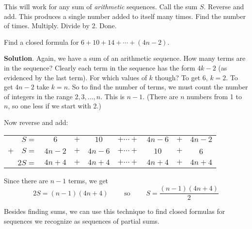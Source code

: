 \documentclass[11pt,]{book}
\theoremstyle{ptxplainnotitle}
\theoremstyle{ptxplaintitle}
\theoremstyle{ptxdefinitionnotitle}
\theoremstyle{ptxdefinitiontitle}
\theoremstyle{ptxdefinitionnotitle}
\theoremstyle{ptxdefinitiontitle}
\theoremstyle{ptxdefinitionnotitle}
\theoremstyle{ptxdefinitiontitle}
\theoremstyle{ptxdefinitiontitlenonumber}
\theoremstyle{ptxdefinitiontitlenonumber}
\numberwithin{equation}{chapter}
\newcommand{\hrulethin}  {\noalign{\hrule height 0.04em}}
\begin{document}
\hypertarget{p-197}{}%
This will work for any sum of \emph{arithmetic} sequences. Call the sum \(S\). Reverse and add. This produces a single number added to itself many times. Find the number of times. Multiply. Divide by 2. Done.%
\begin{example}\label{example-8}
\hypertarget{p-198}{}%
Find a closed formula for \(6 + 10 + 14 + \cdots + (4n - 2)\).%
\par\smallskip%
\noindent\textbf{Solution}.\hypertarget{solution-16}{}\quad%
\hypertarget{p-199}{}%
Again, we have a sum of an arithmetic sequence. How many terms are in the sequence?  Clearly each term in the sequence has the form \(4k -2\) (as evidenced by the last term). For which values of \(k\) though? To get 6, \(k = 2\). To get \(4n-2\) take \(k = n\). So to find the number of terms, we must count the number of integers in the range \(2,3,\ldots, n\). This is \(n-1\). (There are \(n\) numbers from 1 to \(n\), so one less if we start with 2.)%
\par
\hypertarget{p-200}{}%
Now reverse and add:%
\begin{sidebyside}{1}{0}{0}{0}
\begin{sbspanel}{1}
{\centering%
\begin{tabular}{rccccccc}
\(S  =\)&\(6\)&\(+\)&\(10\)&\(+ \cdots +\)&\(4n-6\)&\(+\)&\(4n-2\)\tabularnewline[0pt]
\(+ \quad S  =\)&\(4n-2\)&\(+\)&\(4n-6\)&\(+ \cdots +\)&\(10\)&\(+\)&6\tabularnewline\hrulethin
\(2S  =\)&\(4n+4\)&\(+\)&\(4n+4\)&\(+ \cdots +\)&\(4n+4\)&\(+\)&\(4n+4\)
\end{tabular}
\par}
\end{sbspanel}
\end{sidebyside}
\par
\hypertarget{p-201}{}%
Since there are \(n-1\) terms, we get%
\begin{equation*}
2S = (n-1)(4n+4)\qquad \mbox{ so } \qquad S = \frac{(n-1)(4n+4)}{2}
\end{equation*}
%
\end{example}
\hypertarget{p-202}{}%
Besides finding sums, we can use this technique to find closed formulas for sequences we recognize as sequences of partial sums.%
\end{document}
